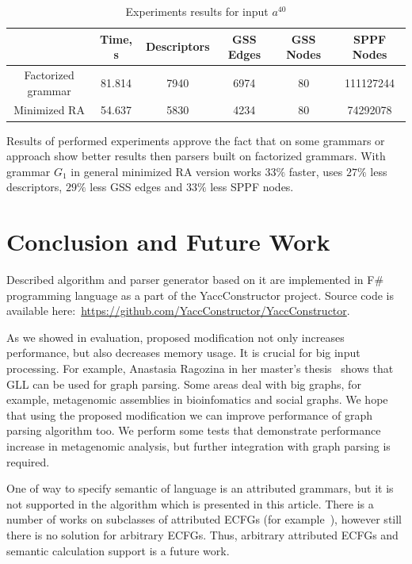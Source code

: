 \documentclass[runningheads,a4paper]{llncs}
\begin{document}
\begin{table}[ht]   
\begin{center}
    \begin{tabular}{ | c | c | c | c | c | c | }
        \hline
                           & Time, s & Descriptors & GSS Edges & GSS Nodes & SPPF Nodes   \\ \hline
        Factorized grammar & 81.814  & 7940        & 6974      & 80        & 111127244  \\ \hline
        Minimized RA       & 54.637  & 5830        & 4234      & 80        & 74292078  \\ \hline
    \end{tabular}
\end{center}
\caption{Experiments results for input $a^{40}$}
\label{expTable}
\end{table}



Results of performed experiments approve the fact that on some grammars or approach 
show better results then parsers built on factorized grammars.
With grammar $G_1$ in general minimized RA version works $33\%$ faster, uses $27\%$ less descriptors, $29\%$ less GSS edges
and $33\%$ less SPPF nodes.

\section{Conclusion and Future Work}

Described algorithm and parser generator based on it are implemented in F\# programming language as a part of the YaccConstructor project.
Source code is available here:~\url{https://github.com/YaccConstructor/YaccConstructor}.

As we showed in evaluation, proposed modification not only increases performance, but also decreases memory usage. 
It is crucial for big input processing.
For example, Anastasia Ragozina in her master's thesis~\cite{ragozina} shows that GLL can be used for graph parsing.  
Some areas deal with big graphs, for example, metagenomic assemblies in bioinfomatics and social graphs.
We hope that using the proposed modification we can improve performance of graph parsing algorithm too. 
We perform some tests that demonstrate performance increase in metagenomic analysis, but further integration with graph parsing is required.

One of way to specify semantic of language is an attributed grammars, but it is not supported in the algorithm which is presented in this article.
There is a number of works on subclasses of attributed ECFGs (for example~\cite{AttributedELL}), however still there is no solution for arbitrary ECFGs.
Thus, arbitrary attributed ECFGs and semantic calculation support is a future work.
\end{document}
